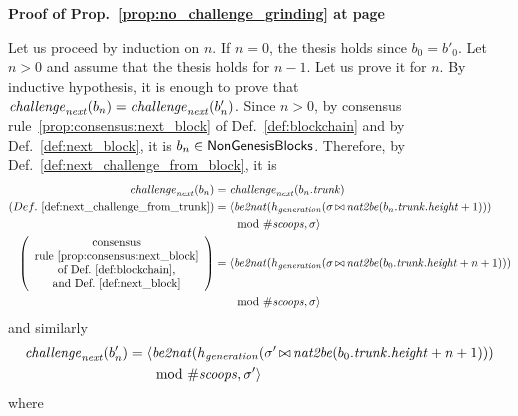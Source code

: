\noindent
\textbf{Proof of Prop.~\ref{prop:no_challenge_grinding} at page~\pageref{prop:no_challenge_grinding}}

\noindent
  Let us proceed by induction on $n$.
  If $n=0$, the thesis holds since $b_0=b'_0$.
  Let $n>0$ and assume that the thesis holds for $n-1$. Let us prove it for $n$.
  By inductive hypothesis, it is enough
  to prove that ${\mathit{challenge}}_{\mathit{next}}(b_n)={\mathit{challenge}}_{\mathit{next}}(b'_n)$.
  Since $n>0$, by consensus rule~\ref{prop:consensus:next_block} of Def.~\ref{def:blockchain}
  and by Def.~\ref{def:next_block}, it is $b_n\in{\mathsf{NonGenesisBlocks}}$. Therefore, by
  Def.~\ref{def:next_challenge_from_block}, it is
  \begin{align*}
    {\mathit{challenge}}_{\mathit{next}}(b_n)&={\mathit{challenge}}_{\mathit{next}}(b_n.{\mathit{trunk}})\\
    (Def.~\ref{def:next_challenge_from_trunk})&=\langle{\mathit{be2nat}}(h_{\mathit{generation}}(\sigma\operatorname*{\bowtie}{\mathit{nat2be}}(b_n.{\mathit{trunk}}.{\mathit{height}}+1)))\\
    &\qquad\text{mod }{\#\mathit{scoops}},\sigma\rangle\\
    \left(\begin{array}{c}
      \text{consensus}\\
      \text{rule~\ref{prop:consensus:next_block}}\\
      \text{of Def.~\ref{def:blockchain},}\\
      \text{and Def.~\ref{def:next_block}}
    \end{array}\right)&=\langle{\mathit{be2nat}}(h_{\mathit{generation}}(\sigma\operatorname*{\bowtie}{\mathit{nat2be}}(b_0.{\mathit{trunk}}.{\mathit{height}}+n+1)))\\
    &\qquad\text{mod }{\#\mathit{scoops}},\sigma\rangle
  \end{align*}
  and similarly
  \begin{align*}
    {\mathit{challenge}}_{\mathit{next}}(b'_n)&=\langle{\mathit{be2nat}}(h_{\mathit{generation}}(\sigma'\operatorname*{\bowtie}{\mathit{nat2be}}(b_0.{\mathit{trunk}}.{\mathit{height}}+n+1)))\\
    &\qquad\text{mod }{\#\mathit{scoops}},\sigma'\rangle
  \end{align*}
  where
